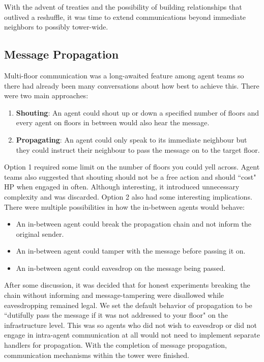 With the advent of treaties and the possibility of building relationships that outlived a reshuffle, it was time to extend communications beyond immediate neighbors to possibly tower-wide.

\subsection{Message Propagation}
Multi-floor communication was a long-awaited feature among agent teams so there had already been many conversations about how best to achieve this. There were two main approaches:
\begin{enumerate}
    \item \textbf{Shouting}: An agent could shout up or down a specified number of floors and every agent on floors in between would also hear the message.
    \item \textbf{Propagating}: An agent could only speak to its immediate neighbour but they could instruct their neighbour to pass the message on to the target floor.
\end{enumerate}
Option 1 required some limit on the number of floors you could yell across. Agent teams also suggested that shouting should not be a free action and should ``cost" HP when engaged in often. Although interesting, it introduced unnecessary complexity and was discarded. \newline
Option 2 also had some interesting implications. There were multiple possibilities in how the in-between agents would behave:
\begin{itemize}
    \item An in-between agent could break the propagation chain and not inform the original sender.
    \item An in-between agent could tamper with the message before passing it on.
    \item An in-between agent could eavesdrop on the message being passed.
\end{itemize}
After some discussion, it was decided that for honest experiments breaking the chain without informing and message-tampering were disallowed while eavesdropping remained legal. \newline
We set the default behavior of propagation to be ``dutifully pass the message if it was not addressed to your floor" on the infrastructure level. This was so agents who did not wish to eavesdrop or did not engage in intra-agent communication at all would not need to implement separate handlers for propagation. \newline
With the completion of message propagation, communication mechanisms within the tower were finished.

